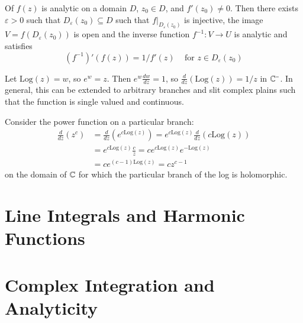\documentclass[12pt, a4paper, oneside, openright, titlepage]{book}
\begin{document}
\begin{thm}
    Of $f(z)$ is analytic on a domain $D$, $z_0 \in D$, and $f'(z_0) \neq 0$. Then there exists $\varepsilon > 0$ such that $D_{\varepsilon}(z_0) \subseteq D$ such that $f\vert_{D_{\varepsilon}(z_0)}$ is injective, the image $V = f(D_{\varepsilon}(z_0))$ is open and the inverse function $f^{-1}:V\rightarrow U$ is analytic and satisfies \begin{equation*}
        (f^{-1})'(f(z)) = 1/f'(z)\;\;\;\text{ for } z \in D_{\varepsilon}(z_0)
    \end{equation*}
\end{thm}

\begin{eg}
    Let $\text{Log}(z) = w$, so $e^w = z$. Then $e^w\frac{dw}{dz} = 1$, so $\frac{d}{dz}(\text{Log}(z)) = 1/z$ in $\mathbb C^-$. In general, this can be extended to arbitrary branches and slit complex plains such that the function is single valued and continuous.
\end{eg}

\begin{eg}
    Consider the power function on a particular branch: \begin{align*}
        \frac{d}{dz}(z^c) &= \frac{d}{dz}(e^{c\text{Log}(z)}) = e^{c\text{Log}(z)}\frac{d}{dz}({c\text{Log}(z)}) \\
        &= e^{c\text{Log}(z)}\frac{c}{z} = ce^{c\text{Log}(z)}e^{-\text{Log}(z)} \\
        &= ce^{(c-1)\text{Log}(z)} = cz^{c-1}
    \end{align*}
    on the domain of $\mathbb C$ for which the particular branch of the log is holomorphic.
\end{eg}








\chapter{Line Integrals and Harmonic Functions}



\chapter{Complex Integration and Analyticity}



\end{document}
